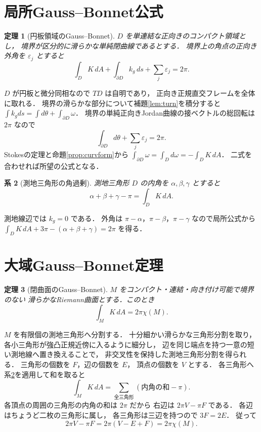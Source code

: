 \documentclass[a5paper,10pt,onecolumn]{jsarticle}
\makeatletter
\theoremstyle{mathnotetheorem}
\newtheorem{theorem}{定理}[section]
\newtheorem{corollary}[theorem]{系}
\renewcommand{\proofname}{証明}
\renewenvironment{proof}[1][\proofname]{%
  \par\pushQED{\qed}\normalfont\topsep4\p@\@plus2\p@\relax
  \trivlist\item[\hskip\labelsep\bfseries #1]\ignorespaces
}{\popQED\endtrivlist\@endpefalse}
\makeatother
\begin{document}
\section{局所Gauss–Bonnet公式}
\begin{theorem}[円板領域のGauss--Bonnet]\label{thm:localGB}
$D$ を単連結な正向きのコンパクト領域とし，
境界が区分的に滑らかな単純閉曲線であるとする．
境界上の角点の正向き外角を $\varepsilon_j$ とすると
\[
 \int_DK\,dA+\int_{\partial D}k_g\,ds+
 \sum_j\varepsilon_j=2\pi.
\]
\end{theorem}
\begin{proof}
$D$ が円板と微分同相なので $TD$ は自明であり，
正向き正規直交フレームを全体に取れる．
境界の滑らかな部分について補題\ref{lem:turn}を積分すると
$\int k_gds=\int d\theta+\int_{\partial D}\omega$．
境界の単純正向きJordan曲線の接ベクトルの総回転は
$2\pi$ なので
\[
 \int_{\partial D}d\theta+\sum_j\varepsilon_j=2\pi.
\]
Stokesの定理と命題\ref{prop:curvform}から
$\int_{\partial D}\omega=\int_Dd\omega=-\int_DK\,dA$．
二式を合わせれば所望の公式となる．
\end{proof}
\begin{corollary}[測地三角形の角過剰]\label{cor:angle}
測地三角形 $D$ の内角を $\alpha,\beta,\gamma$ とすると
\[
 \alpha+\beta+\gamma-\pi=\int_DK\,dA.
\]
\end{corollary}
\begin{proof}
測地線辺では $k_g=0$ である．
外角は $\pi-\alpha$，$\pi-\beta$，$\pi-\gamma$
なので局所公式から
$\int_DK\,dA+3\pi-(\alpha+\beta+\gamma)=2\pi$ を得る．
\end{proof}
\section{大域Gauss–Bonnet定理}
\begin{theorem}[閉曲面のGauss--Bonnet]\label{thm:globalGB}
$M$ をコンパクト・連結・向き付け可能で境界のない
滑らかなRiemann曲面とする．このとき
\[
 \boxed{\int_MK\,dA=2\pi\chi(M)}.
\]
\end{theorem}
\begin{proof}
$M$ を有限個の測地三角形へ分割する．
十分細かい滑らかな三角形分割を取り，
各小三角形が強凸正規近傍に入るように細分し，
辺を同じ端点を持つ一意の短い測地線へ置き換えることで，
非交叉性を保持した測地三角形分割を得られる．
三角形の個数を $F$，辺の個数を $E$，
頂点の個数を $V$ とする．
各三角形へ系\ref{cor:angle}を適用して和を取ると
\[
 \int_MK\,dA=
 \sum_{\text{全三角形}}\left(
  \text{内角の和}-\pi\right).
\]
各頂点の周囲の三角形の内角の和は $2\pi$ だから
右辺は $2\pi V-\pi F$ である．
各辺はちょうど二枚の三角形に属し，
各三角形は三辺を持つので $3F=2E$．
従って
\[
 2\pi V-\pi F
 =2\pi(V-E+F)=2\pi\chi(M).
\]
\end{proof}
\end{document}
